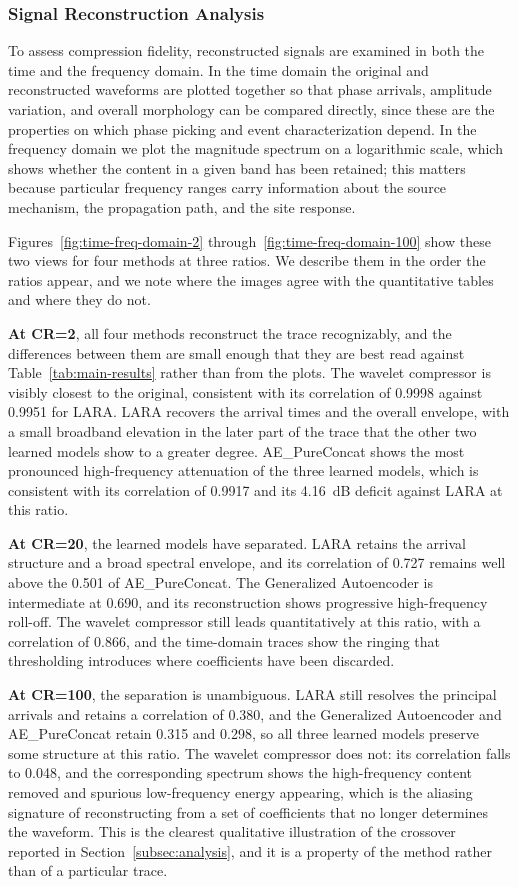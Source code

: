 \documentclass[fleqn,10pt]{wlscirep}
\begin{document}
\subsubsection{Signal Reconstruction Analysis}

To assess compression fidelity, reconstructed signals are examined in both the time and the frequency domain. In the time domain the original and reconstructed waveforms are plotted together so that phase arrivals, amplitude variation, and overall morphology can be compared directly, since these are the properties on which phase picking and event characterization depend. In the frequency domain we plot the magnitude spectrum on a logarithmic scale, which shows whether the content in a given band has been retained; this matters because particular frequency ranges carry information about the source mechanism, the propagation path, and the site response.

Figures~\ref{fig:time-freq-domain-2} through~\ref{fig:time-freq-domain-100} show these two views for four methods at three ratios. We describe them in the order the ratios appear, and we note where the images agree with the quantitative tables and where they do not.

\textbf{At CR=2}, all four methods reconstruct the trace recognizably, and the differences between them are small enough that they are best read against Table~\ref{tab:main-results} rather than from the plots. The wavelet compressor is visibly closest to the original, consistent with its correlation of 0.9998 against 0.9951 for LARA. LARA recovers the arrival times and the overall envelope, with a small broadband elevation in the later part of the trace that the other two learned models show to a greater degree. AE\_PureConcat shows the most pronounced high-frequency attenuation of the three learned models, which is consistent with its correlation of 0.9917 and its 4.16~dB deficit against LARA at this ratio.

\textbf{At CR=20}, the learned models have separated. LARA retains the arrival structure and a broad spectral envelope, and its correlation of 0.727 remains well above the 0.501 of AE\_PureConcat. The Generalized Autoencoder is intermediate at 0.690, and its reconstruction shows progressive high-frequency roll-off. The wavelet compressor still leads quantitatively at this ratio, with a correlation of 0.866, and the time-domain traces show the ringing that thresholding introduces where coefficients have been discarded.

\textbf{At CR=100}, the separation is unambiguous. LARA still resolves the principal arrivals and retains a correlation of 0.380, and the Generalized Autoencoder and AE\_PureConcat retain 0.315 and 0.298, so all three learned models preserve some structure at this ratio. The wavelet compressor does not: its correlation falls to 0.048, and the corresponding spectrum shows the high-frequency content removed and spurious low-frequency energy appearing, which is the aliasing signature of reconstructing from a set of coefficients that no longer determines the waveform. This is the clearest qualitative illustration of the crossover reported in Section~\ref{subsec:analysis}, and it is a property of the method rather than of a particular trace.
\end{document}
